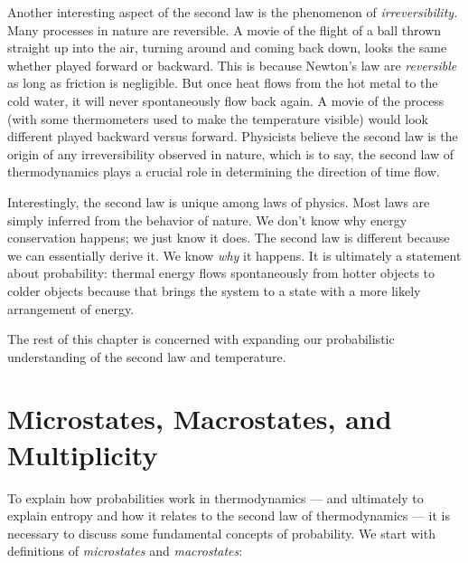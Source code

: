 Another interesting aspect of the second law is the phenomenon of \textit{irreversibility.}  Many processes in nature are reversible.  A movie of
the flight of a ball thrown straight up into the air, turning around and
coming back down, looks the same whether played forward or backward.
This is because Newton's law are \textit{reversible} as long as friction
is negligible.  But once heat flows from the hot metal to the cold
water, it will never spontaneously  flow back again.  A movie of the
process (with some thermometers used to make the temperature visible)
would look different played backward versus forward.  Physicists believe
the second law is the origin of any irreversibility observed in nature,
which is to say, the second law of thermodynamics plays a crucial role
in determining the direction of time flow.

Interestingly, the second law is unique among laws of physics.  Most
laws are simply inferred from the behavior of nature.  We don't know
why energy conservation happens; we just know it does.  The second law
is different because we can essentially derive it.  We know \textit{why}
it happens.  It is ultimately a statement about probability: thermal
energy flows spontaneously from hotter objects to colder objects
because that brings the system to a state with a more 
likely arrangement of energy.  

The rest of this chapter is concerned with expanding our probabilistic
understanding of the second law and temperature.  

\section{Microstates, Macrostates, and Multiplicity}

To explain how probabilities work in thermodynamics --- and ultimately
to explain entropy and how it relates to the second law of
thermodynamics --- it is necessary to discuss some fundamental
concepts of probability.  We start with definitions of 
\emph{microstates} and \emph{macrostates}:


